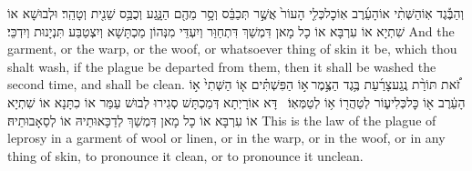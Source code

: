 {וְהַבֶּ֡גֶד אֽוֹ\maqqaf הַשְּׁתִ֨י אוֹ\maqqaf הָעֵ֜רֶב אֽוֹ\maqqaf כׇל\maqqaf כְּלִ֤י הָעוֹר֙ אֲשֶׁ֣ר תְּכַבֵּ֔ס וְסָ֥ר מֵהֶ֖ם הַנָּ֑גַע וְכֻבַּ֥ס שֵׁנִ֖ית וְטָהֵֽר׃}
{וּלְבוּשָׁא אוֹ שִׁתְיָא אוֹ עִרְבָּא אוֹ כָל מָאן דִּמְשַׁךְ דִּתְחַוַּר וְיִעְדֵּי מִנְּהוֹן מַכְתָּשָׁא וְיִצְטַבַּע תִּנְיָנוּת וְיִדְכֵּי׃}
{And the garment, or the warp, or the woof, or whatsoever thing of skin it be, which thou shalt wash, if the plague be departed from them, then it shall be washed the second time, and shall be clean.}{}
{זֹ֠את תּוֹרַ֨ת נֶֽגַע\maqqaf צָרַ֜עַת בֶּ֥גֶד הַצֶּ֣מֶר \legarmeh  א֣וֹ הַפִּשְׁתִּ֗ים א֤וֹ הַשְּׁתִי֙ א֣וֹ הָעֵ֔רֶב א֖וֹ כׇּל\maqqaf כְּלִי\maqqaf ע֑וֹר לְטַהֲר֖וֹ א֥וֹ לְטַמְּאֽוֹ׃ \petucha }
{דָּא אוֹרָיְתָא דְּמַכְתָּשׁ סְגִירוּ לְבוּשׁ עַמַּר אוֹ כִתָּנָא אוֹ שִׁתְיָא אוֹ עִרְבָּא אוֹ כָל מָאן דִּמְשַׁךְ לְדַכָּאוּתֵיהּ אוֹ לְסַאָבוּתֵיהּ׃}
{This is the law of the plague of leprosy in a garment of wool or linen, or in the warp, or in the woof, or in any thing of skin, to pronounce it clean, or to pronounce it unclean.}{}


